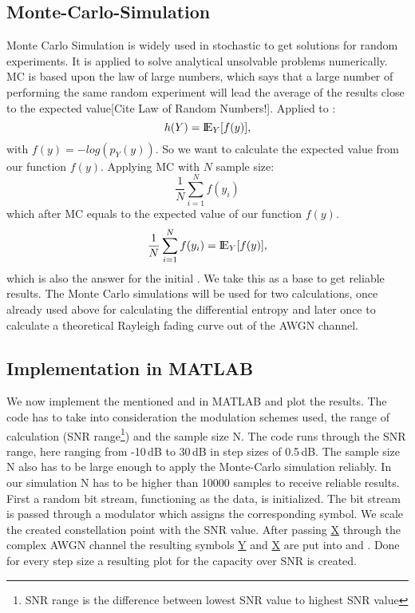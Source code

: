 \subsection{Monte-Carlo-Simulation}
\label{sec:MCS}
Monte Carlo Simulation is widely used in stochastic to get solutions for random experiments. It is applied to solve analytical unsolvable problems numerically. MC is based upon the law of large numbers, which says that a large number of performing the same random experiment will lead the average of the results close to the expected value[Cite Law of Random Numbers!]. 
Applied to :
\begin{equation}
\label{eq:MCEntropy2}
h(Y) = {\mbox{I\negthinspace E}}_Y[f(y)],
\end{equation}
with $f(y) = -log(p_Y(y))$. So we want to calculate the expected value from our function $f(y)$. 
\newline
Applying \gls{MC} with $N$ sample size:
\begin{equation}
\frac{1}{N}\sum_{i=1}^{N}f(y_i) 
\end{equation}
which after \gls{MC} equals to the expected value of our function $f(y)$.
\begin{equation}
\frac{1}{N}\sum_{i=1}^{N}f(y_i) = \mbox{I\negthinspace E}_Y[f(y)],
\end{equation}
which is also the answer for the initial .
We take this as a base to get reliable results. The Monte Carlo simulations will be used for two calculations, once already used above for calculating the differential entropy and later once to calculate a theoretical Rayleigh fading curve out of the AWGN channel. 

\subsection{Implementation in MATLAB}
\label{AWGNMAT}
We now implement the mentioned  and  in MATLAB and plot the results. The code has to take into consideration the modulation schemes used, the range of calculation (SNR range\footnote{SNR range is the difference between lowest SNR value to highest SNR value}) and the sample size N. The code runs through the SNR range, here ranging from -10\,dB to 30\,dB in step sizes of 0.5\,dB. The sample size N also has to be large enough to apply the Monte-Carlo simulation reliably. In our simulation N has to be higher than 10000 samples to receive reliable results. First a random bit stream, functioning as the data, is initialized. The bit stream is passed through a modulator which assigns the corresponding symbol. We scale the created constellation point with the SNR value. After passing \underline{X} through the complex AWGN channel the resulting symbols \underline{Y} and \underline{X} are put into  and . Done for every step size a resulting plot for the capacity over SNR is created.  
    

